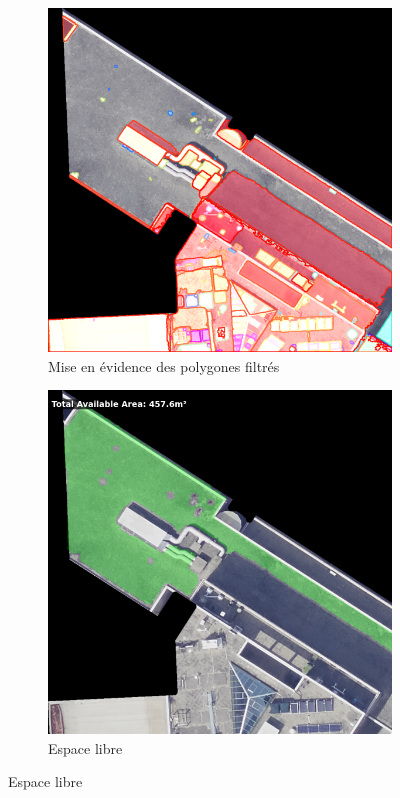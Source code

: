 \begin{figure}[H]
    \vspace{0.35cm} %
    
    \begin{subfigure}[b]{0.48\textwidth}
        \centering
        \includegraphics[width=\textwidth]{02-main/figures/ch3_essai_sam_05_filtered_masks_overlay.png}
        \caption{Mise en évidence des polygones filtrés}
        \label{fig:ch3_essai_sam_05_filtered_masks_overlay}
    \end{subfigure}
    \hfill
    \begin{subfigure}[b]{0.48\textwidth}
        \centering
        \includegraphics[width=\textwidth]{02-main/figures/ch3_essai_sam_06_une_zone_libre.png}
        \caption{Espace libre}
        \label{fig:ch3_essai_sam_06_une_zone_libre}
    \end{subfigure}


\end{figure}
